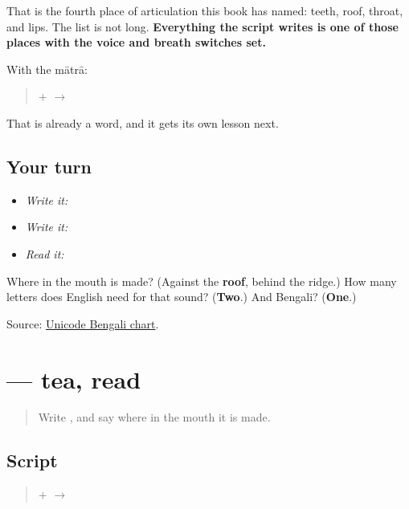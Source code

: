 That is the fourth place of articulation this book has named: teeth, roof, throat, and lips. The list is not long. \textbf{Everything the script writes is one of those places with the voice and breath switches set.}

With the mātrā:

\begin{quote}
\textbf{} + \textbf{} $\to$ \textbf{}
\end{quote}

That is already a word, and it gets its own lesson next.

\subsection*{Your turn}
\begin{itemize}
\raggedright
  \item \emph{Write it:} 
  \item \emph{Write it:} 
  \item \emph{Read it:} 
\end{itemize}

\begin{tcolorbox}[breakable,colback=teal!4,colframe=teal!35!black,title={Before you move on}]
Where in the mouth is \textbf{} made? (Against the \textbf{roof}, behind the ridge.) How many letters does English need for that sound? (\textbf{Two}.) And Bengali? (\textbf{One}.)

Source: \href{https://www.unicode.org/charts/PDF/U0980.pdf}{Unicode Bengali chart}.
\end{tcolorbox}
\section[chā]{ — tea, read}

\label{lesson:BN-W04-chaa-read}



\begin{quote}
Write \textbf{}, and say where in the mouth it is made.
\end{quote}

\subsection*{Script}
\begin{quote}
\textbf{} + \textbf{} $\to$ \textbf{}
\end{quote}

